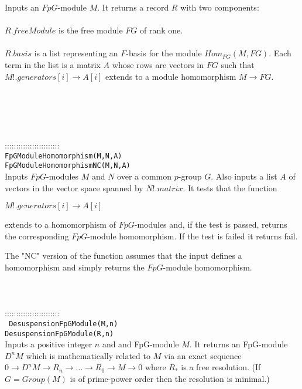 \documentclass[a4paper,11pt]{report}
\begin{document}
{ Inputs an $FpG$-module $M$. It returns a record $R$ with two components: \\
 \\
$R.freeModule$ is the free module $FG$ of rank one.\\
 \\
$R.basis$ is a list representing an $F$-basis for the module $Hom_{FG}(M,FG)$. Each term in the list is a matrix $A$ whose rows are vectors in $FG$ such that $M!.generators[i] \longrightarrow A[i]$ extends to a module homomorphism $M \longrightarrow FG$. \\
 \\
 \\
 \\
 \\
 \\
 ::::::::::::::::::::::::\\
 \texttt{FpGModuleHomomorphism(M,N,A) }\\
 \texttt{FpGModuleHomomorphismNC(M,N,A) }\\
 

 Inputs $FpG$-modules $M$ and $N$ over a common $p$-group $G$. Also inputs a list $A$ of vectors in the vector space spanned by $N!.matrix$. It tests that the function 

 $ M!.generators[i] \longrightarrow A[i]$ 

 extends to a homomorphism of $FpG$-modules and, if the test is passed, returns the corresponding $FpG$-module homomorphism. If the test is failed it returns fail. 

 The "NC" version of the function assumes that the input defines a homomorphism
and simply returns the $FpG$-module homomorphism. \\
 \\
 \\
 \\
 ::::::::::::::::::::::::\\
 \texttt{ DesuspensionFpGModule(M,n)}\\
 \texttt{DesuspensionFpGModule(R,n) }\\
 

 Inputs a positive integer $n$ and and FpG-module $M$. It returns an FpG-module $D^nM$ which is mathematically related to $M$ via an exact sequence $ 0 \longrightarrow D^nM \longrightarrow R_n \longrightarrow \ldots
\longrightarrow R_0 \longrightarrow M \longrightarrow 0$ where $R_\ast$ is a free resolution. (If $G=Group(M)$ is of prime-power order then the resolution is minimal.) 

}
\end{document}
